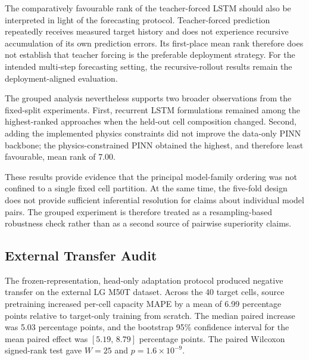 \documentclass[a4paper,fleqn]{cas-sc}
\begin{document}
The comparatively favourable rank of the teacher-forced LSTM should also be interpreted in light of the forecasting protocol. Teacher-forced prediction repeatedly receives measured target history and does not experience recursive accumulation of its own prediction errors. Its first-place mean rank therefore does not establish that teacher forcing is the preferable deployment strategy. For the intended multi-step forecasting setting, the recursive-rollout results remain the deployment-aligned evaluation.

The grouped analysis nevertheless supports two broader observations from the fixed-split experiments. First, recurrent LSTM formulations remained among the highest-ranked approaches when the held-out cell composition changed. Second, adding the implemented physics constraints did not improve the data-only PINN backbone; the physics-constrained PINN obtained the highest, and therefore least favourable, mean rank of 7.00.

These results provide evidence that the principal model-family ordering was not confined to a single fixed cell partition. At the same time, the five-fold design does not provide sufficient inferential resolution for claims about individual model pairs. The grouped experiment is therefore treated as a resampling-based robustness check rather than as a second source of pairwise superiority claims.


\subsection{External Transfer Audit}
\label{sec:transfer_results}

The frozen-representation, head-only adaptation protocol produced negative
transfer on the external LG M50T dataset. Across the 40 target cells, source
pretraining increased per-cell capacity MAPE by a mean of 6.99 percentage
points relative to target-only training from scratch. The median paired
increase was 5.03 percentage points, and the bootstrap 95\% confidence
interval for the mean paired effect was
$[5.19,\,8.79]$ percentage points. The paired Wilcoxon signed-rank test gave
$W=25$ and $p=1.6\times10^{-9}$.
\end{document}
